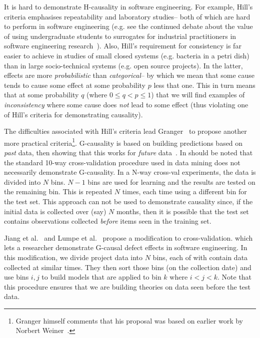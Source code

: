 \documentclass[conference]{IEEEtran}
\begin{document}
{It is hard to demonstrate H-causality in software engineering.
For example, Hill's criteria emphasises repeatability and laboratory studies-- both of which are
hard to perform in software engineering (e.g. see the continued debate about
the value of using undergraduate students to surrogates for industrial
practitioners in software engineering research~\cite{Carver2003}). Also, Hill's requirement
for consistency is far easier to achieve in studies of small closed systems (e.g. bacteria in a petri dish)
than in large socio-technical systems (e.g. open source projects). In the latter,
effects are more {\em probabilistic} than {\em categorical}-- by which we mean that 
some cause tends to cause some effect at some probability $p$ less that one.
This in turn means that at some probability $q$ (where $0 \le q < p \le 1$)
that we will find examples of {\em inconsistency} where some cause does {\em not} lead
to some effect (thus violating one of Hill's criteria for demonstrating causality).

The  difficulties associated with Hill's criteria lead Granger~\cite{granger80}
to propose another more practical criteria\footnote{Granger  himself comments that
his proposal was based on earlier work by Norbert Weiner~\cite{Seth2007}.}.
\mbox{G-causality} is based on building predictions based on {\em past} data,
then showing that this works for {\em future} data~\cite{granger80}. 
In should be noted  that the standard 10-way cross-validation
procedure used  in data mining does not necessarily demonstrate G-causality.  In a N-way cross-val experiments, the data is divided into $N$ bins.  
$N-1$ bins are used for learning and the results are tested
on the  remaining bin.
This is repeated $N$ times, each time using a different bin for the test set.
This approach can not be used to demonstrate causality since, if the initial data is collected
over (say) $N$ months, then it is possible that the test set contains observations collected
{\em before}   items seen in the training set. 

Jiang et al.~\cite{me11f} and Lumpe et al.~\cite{me11f} propose a modification to cross-validation.
which lets a researcher
demonstrate G-causal defect effects in software engineering.
In this modification, we  divide project data  into $N$ bins, each of with contain data collected at similar times.
They then sort those bins (on the collection date) and use bins $i,j$ to build models that
are applied to bin  $k$ where 
$i<j<k$. Note that this procedure ensures that we are building theories on data seen
before the test data.

}
\end{document}
